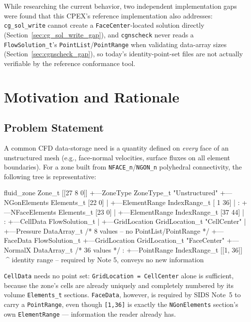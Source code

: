 \documentclass[11pt,letterpaper]{article}
\makeatletter
\let\cgns@orig@lstlisting\lstlisting
\let\cgns@endorig@lstlisting\endlstlisting
\renewenvironment{lstlisting}
  {\par\needspace{5\baselineskip}\nolinenumbers\cgns@orig@lstlisting}
  {\cgns@endorig@lstlisting\par\linenumbers}
\makeatother
\begin{document}
While researching the current behavior, two independent implementation
gaps were found that this CPEX's reference implementation also addresses:
\texttt{cg\_sol\_write} cannot create a \texttt{FaceCenter}-located
solution directly (Section~\ref{sec:cg_sol_write_gap}), and
\texttt{cgnscheck} never reads a \texttt{FlowSolution\_t}'s
\texttt{PointList}/\texttt{PointRange} when validating data-array sizes
(Section~\ref{sec:cgnscheck_gap}), so today's identity-point-set files are
not actually verifiable by the reference conformance tool.

\section{Motivation and Rationale}

\subsection{Problem Statement}
\label{sec:problem-statement}

A common CFD data-storage need is a quantity defined on \emph{every} face
of an unstructured mesh (e.g., face-normal velocities, surface fluxes on
all element boundaries). For a zone built from \texttt{NFACE\_n}/\texttt{NGON\_n}
polyhedral connectivity, the following tree is representative:

\begin{lstlisting}[language=C]
fluid_zone Zone_t [[27  8  0]]
+---ZoneType ZoneType_t "Unstructured"
+---NGonElements Elements_t [22  0]
|   +---ElementRange IndexRange_t [ 1 36]
|   :
+---NFaceElements Elements_t [23  0]
|   +---ElementRange IndexRange_t [37 44]
|   :
+---CellData FlowSolution_t
|   +---GridLocation GridLocation_t "CellCenter"
|   +---Pressure DataArray_t   /* 8 values -- no PointList/PointRange */
+---FaceData FlowSolution_t
    +---GridLocation GridLocation_t "FaceCenter"
    +---NormalX DataArray_t     /* 36 values */
    :
    +---PointRange IndexRange_t [[1, 36]]
        ^^^^ identity range -- required by Note 5, conveys no new information
\end{lstlisting}

\texttt{CellData} needs no point set: \texttt{GridLocation~=~CellCenter}
alone is sufficient, because the zone's cells are already uniquely and
completely numbered by its volume \texttt{Elements\_t} sections.
\texttt{FaceData}, however, is required by SIDS Note~5 to carry a
\texttt{PointRange}, even though \texttt{[1,36]} is exactly the
\texttt{NGonElements} section's own \texttt{ElementRange} --- information
the reader already has.
\end{document}
